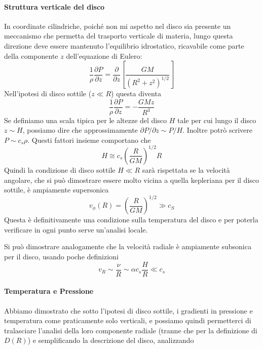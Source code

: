 \documentclass[a4paperbi]{article}
\begin{document}
	\paragraph{Struttura verticale del disco}
	In coordinate cilindriche, poiché non mi aspetto nel disco sia presente un meccanismo che permetta del trasporto verticale di materia, lungo questa direzione deve essere mantenuto l'equilibrio idrostatico, ricavabile come parte della componente $z$ dell'equazione di Eulero:
	\begin{equation*}
		\frac{1}{\rho}\frac{\partial P}{\partial z}=\frac{\partial}{\partial z}\left[\frac{GM}{(R^2+z^2)^{1/2}}\right]
	\end{equation*}
	Nell'ipotesi di disco sottile ($z\ll R$) questa diventa
	\begin{equation}
		\frac{1}{\rho}\frac{\partial P}{\partial z}=-\frac{GMz}{R^3}
	\end{equation}
	Se definiamo una scala tipica per le altezze del disco $H$ tale per cui lungo il disco $z\sim H$, possiamo dire che approssimamente $\partial P/\partial z\sim P/H$. Inoltre potrò scrivere $P\sim c_s\rho$.
	Questi fattori insieme comportano che
	\begin{equation}
		H\cong c_s\left(\frac{R}{GM}\right)^{1/2}R
	\end{equation}
	Quindi la condizione di disco sottile $H\ll R$ sarà rispettata se la velocità angolare, che si può dimostrare essere molto vicina a quella kepleriana per il disco sottile, è ampiamente supersonica
	\begin{equation}
		v_\phi(R)=\left(\frac{R}{GM}\right)^{1/2}\gg c_S
	\end{equation}
	Questa è definitivamente una condizione sulla temperatura del disco e per poterla verificare in ogni punto serve un'analisi locale.
	
	Si può dimostrare analogamente che la velocità radiale è ampiamente subsonica per il disco, usando poche definizioni
	\begin{equation}
		v_R\sim\frac{\nu}{R}\sim\alpha c_s\frac{H}{R}\ll c_s
	\end{equation}
	
	\paragraph{Temperatura e Pressione} Abbiamo dimostrato che sotto l'ipotesi di disco sottile, i gradienti in pressione e temperatura come praticamente solo verticali, e possiamo quindi permetterci di tralasciare l'analisi della loro componente radiale (tranne che per la definizione di $D(R)$) e semplificando la descrizione del disco, analizzando
	
\end{document}
